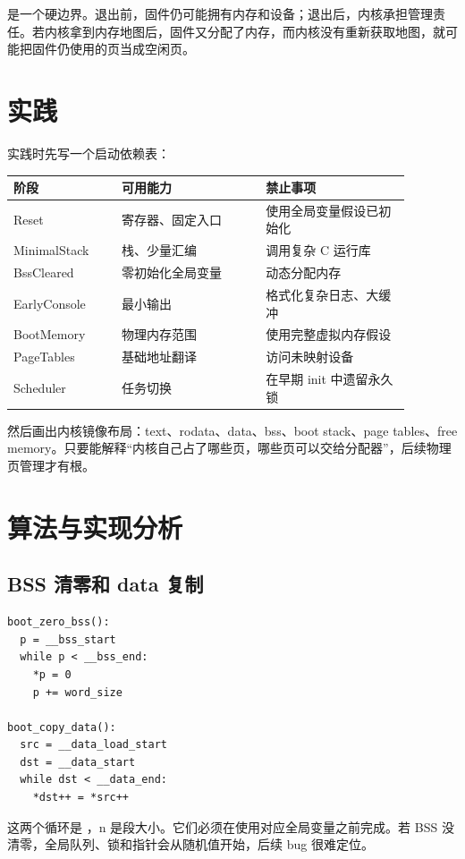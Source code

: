 是一个硬边界。退出前，固件仍可能拥有内存和设备；退出后，内核承担管理责任。若内核拿到内存地图后，固件又分配了内存，而内核没有重新获取地图，就可能把固件仍使用的页当成空闲页。

\section{实践}

实践时先写一个启动依赖表：

\begin{longtable}{p{0.24\linewidth}p{0.32\linewidth}p{0.32\linewidth}}
\toprule
阶段 & 可用能力 & 禁止事项 \\
\midrule
Reset & 寄存器、固定入口 & 使用全局变量假设已初始化 \\
MinimalStack & 栈、少量汇编 & 调用复杂 C 运行库 \\
BssCleared & 零初始化全局变量 & 动态分配内存 \\
EarlyConsole & 最小输出 & 格式化复杂日志、大缓冲 \\
BootMemory & 物理内存范围 & 使用完整虚拟内存假设 \\
PageTables & 基础地址翻译 & 访问未映射设备 \\
Scheduler & 任务切换 & 在早期 init 中遗留永久锁 \\
\bottomrule
\end{longtable}

然后画出内核镜像布局：text、rodata、data、bss、boot stack、page tables、free memory。只要能解释“内核自己占了哪些页，哪些页可以交给分配器”，后续物理页管理才有根。

\section{算法与实现分析}

\subsection{BSS 清零和 data 复制}

\begin{lstlisting}
boot_zero_bss():
  p = __bss_start
  while p < __bss_end:
    *p = 0
    p += word_size

boot_copy_data():
  src = __data_load_start
  dst = __data_start
  while dst < __data_end:
    *dst++ = *src++
\end{lstlisting}

这两个循环是 ，n 是段大小。它们必须在使用对应全局变量之前完成。若 BSS 没清零，全局队列、锁和指针会从随机值开始，后续 bug 很难定位。

